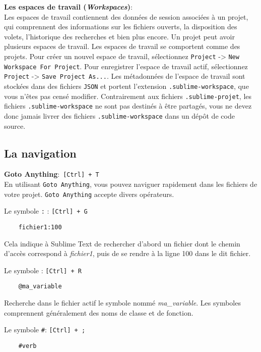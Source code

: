 \documentclass[french,a4paper]{article}
\begin{document}
\textbf{Les espaces de travail (\textit{Workspaces})}: \\ 
Les espaces de travail contiennent des données de session associées à un 
 projet, qui comprennent des informations sur les fichiers ouverts, la 
 disposition des volets, l'historique des recherches et bien plus encore. Un 
 projet peut avoir plusieurs espaces de travail. Les espaces de travail se 
 comportent comme des projets. Pour créer un nouvel espace de travail, 
 sélectionnez \texttt{Project} -> \texttt{New Workspace For Project}. Pour
 enregistrer l'espace de travail actif, sélectionnez \texttt{Project} -> 
 \texttt{Save Project As...}. Les métadonnées de l'espace de travail sont 
 stockées dans des fichiers \texttt{JSON} et portent l'extension 
 \texttt{.sublime-workspace}, que vous n'êtes pas censé modifier. Contrairement
 aux fichiers \texttt{.sublime-projet}, les fichiers 
 \texttt{.sublime-workspace} ne sont pas destinés à être partagés, vous ne 
 devez donc jamais livrer des fichiers \texttt{.sublime-workspace} dans un 
 dépôt de code source.
\bigskip

\subsection*{La navigation}
\textbf{Goto Anything}: \texttt{[Ctrl] + T} \\
En utilisant \texttt{Goto Anything}, vous pouvez naviguer rapidement dans les
 fichiers de votre projet. \texttt{Goto Anything} accepte divers opérateurs. \\
\medskip

Le symbole \og \texttt{:}\fg{} : \texttt{[Ctrl] + G}
\begin{verbatim}
    fichier1:100
\end{verbatim}

Cela indique à Sublime Text de rechercher d'abord un fichier dont le chemin
 d'accès correspond à \textit{fichier1}, puis de se rendre à la ligne 100 dans
 le dit fichier. \\
\medskip

Le symbole \texttt{\@}: \texttt{[Ctrl] + R}
\begin{verbatim}
    @ma_variable
\end{verbatim}

Recherche dans le fichier actif le symbole nommé \textit{ma\_variable}. Les
symboles comprennent généralement des noms de classe et de fonction.
\medskip

Le symbole \texttt{\#}: \texttt{[Ctrl] + ;}
\begin{verbatim}
    #verb
\end{verbatim}
\end{document}

